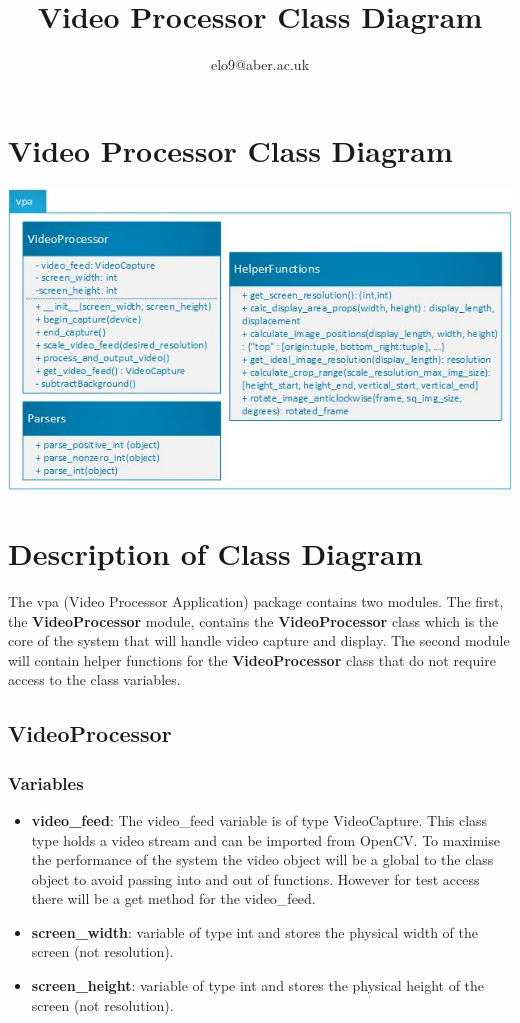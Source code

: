\documentclass{article}
\title{Video Processor Class Diagram}
\author{elo9@aber.ac.uk}
\begin{document}
\maketitle
\tableofcontents

\newpage

\section{Video Processor Class Diagram}
\includegraphics[width=\textwidth]{VideoProcessorClassDiagramImage}


\section{Description of Class Diagram}
The vpa (Video Processor Application) package contains two modules. The first, the \textbf{VideoProcessor} module, contains the \textbf{VideoProcessor} class which is the core of the system that will handle video capture and display. The second module will contain helper functions for the \textbf{VideoProcessor} class that do not require access to the class variables.

\subsection{VideoProcessor}
\subsubsection{Variables}
\begin{itemize}

	\item \textbf{video\_feed}: The video\_feed variable is of type VideoCapture. This class type holds a video stream and can be imported from OpenCV. To maximise the performance of the system the video object will be a global to the class object to avoid passing into and out of functions. However for test access there will be a get method for the video\_feed.

	\item \textbf{screen\_width}: variable of type int and stores the physical width of the screen (not resolution).
	
	\item \textbf{screen\_height}: variable of type int and stores the physical height of the screen (not resolution).
\end{itemize}
\end{document}
